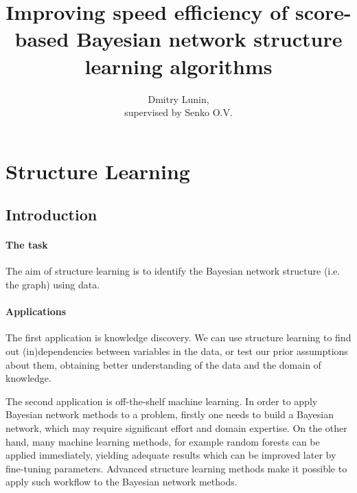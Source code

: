 \documentclass{article}
\author{Dmitry Lunin, \\ \small supervised by Senko O.V.}
\title{Improving speed efficiency of score-based Bayesian network structure learning algorithms}
\begin{document}
\maketitle
\tableofcontents
\pagebreak


\section{Structure Learning}
\subsection{Introduction}
\paragraph{The task} The aim of structure learning is to identify the Bayesian network structure (i.e. the graph) using data. 

\paragraph{Applications}

The first application is knowledge discovery. We can use structure learning to find out (in)dependencies between variables in the data, or test our prior assumptions about them, obtaining better understanding of the data and the domain of knowledge. 

The second application is off-the-shelf machine learning. In order to apply Bayesian network methods to a problem, firstly one needs to build a Bayesian network, which may require significant effort and domain expertise. On the other hand, many machine learning methods, for example random forests can be applied immediately, yielding adequate results which can be improved later by fine-tuning parameters. Advanced structure learning methods make it possible to apply such workflow to the Bayesian network methods.
\end{document}
